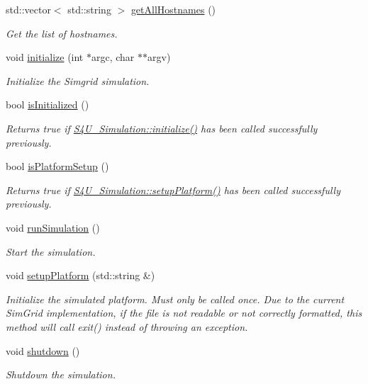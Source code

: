 \begin{DoxyCompactItemize}
\item 
std\+::vector$<$ std\+::string $>$ \hyperlink{classwrench_1_1_s4_u___simulation_a72770be3bff81efae817e322b8b228d6}{get\+All\+Hostnames} ()
\begin{DoxyCompactList}\small\item\em Get the list of hostnames. \end{DoxyCompactList}\item 
void \hyperlink{classwrench_1_1_s4_u___simulation_a70b123a78f90e8e1f432111c3ce93929}{initialize} (int $\ast$argc, char $\ast$$\ast$argv)
\begin{DoxyCompactList}\small\item\em Initialize the Simgrid simulation. \end{DoxyCompactList}\item 
bool \hyperlink{classwrench_1_1_s4_u___simulation_a0139f6818fee5e36c1ac3cc18c417be7}{is\+Initialized} ()
\begin{DoxyCompactList}\small\item\em Returns true if \hyperlink{classwrench_1_1_s4_u___simulation_a70b123a78f90e8e1f432111c3ce93929}{S4\+U\+\_\+\+Simulation\+::initialize()} has been called successfully previously. \end{DoxyCompactList}\item 
bool \hyperlink{classwrench_1_1_s4_u___simulation_a43730166b317647c4af355ebce2de5fc}{is\+Platform\+Setup} ()
\begin{DoxyCompactList}\small\item\em Returns true if \hyperlink{classwrench_1_1_s4_u___simulation_a787dce31d634da739172a9f0fb0e8e30}{S4\+U\+\_\+\+Simulation\+::setup\+Platform()} has been called successfully previously. \end{DoxyCompactList}\item 
void \hyperlink{classwrench_1_1_s4_u___simulation_a7658128602b3a342bc0daecff9459f36}{run\+Simulation} ()
\begin{DoxyCompactList}\small\item\em Start the simulation. \end{DoxyCompactList}\item 
void \hyperlink{classwrench_1_1_s4_u___simulation_a787dce31d634da739172a9f0fb0e8e30}{setup\+Platform} (std\+::string \&)
\begin{DoxyCompactList}\small\item\em Initialize the simulated platform. Must only be called once. Due to the current Sim\+Grid implementation, if the file is not readable or not correctly formatted, this method will call exit() instead of throwing an exception. \end{DoxyCompactList}\item 
\mbox{\label{classwrench_1_1_s4_u___simulation_ab47a352ab32ee542413ed04255f0f6fc}} 
void \hyperlink{classwrench_1_1_s4_u___simulation_ab47a352ab32ee542413ed04255f0f6fc}{shutdown} ()
\begin{DoxyCompactList}\small\item\em Shutdown the simulation. \end{DoxyCompactList}\end{DoxyCompactItemize}
